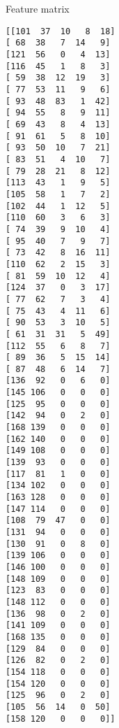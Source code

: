 \documentclass[a4paper]{article}
\begin{document}
~\\~\\
Feature matrix\\
\begin{lstlisting}
[[101  37  10   8  18]
[ 68  38   7  14   9]
[121  56   0   4  13]
[116  45   1   8   3]
[ 59  38  12  19   3]
[ 77  53  11   9   6]
[ 93  48  83   1  42]
[ 94  55   8   9  11]
[ 69  43   8   4  13]
[ 91  61   5   8  10]
[ 93  50  10   7  21]
[ 83  51   4  10   7]
[ 79  28  21   8  12]
[113  43   1   9   5]
[105  58   1   7   2]
[102  44   1  12   5]
[110  60   3   6   3]
[ 74  39   9  10   4]
[ 95  40   7   9   7]
[ 73  42   8  16  11]
[110  62   2  15   3]
[ 81  59  10  12   4]
[124  37   0   3  17]
[ 77  62   7   3   4]
[ 75  43   4  11   6]
[ 90  53   3  10   5]
[ 61  31  31   5  49]
[112  55   6   8   7]
[ 89  36   5  15  14]
[ 87  48   6  14   7]
[136  92   0   6   0]
[145 106   0   0   0]
[125  95   0   0   0]
[142  94   0   2   0]
[168 139   0   0   0]
[162 140   0   0   0]
[149 108   0   0   0]
[139  93   0   0   0]
[117  81   1   0   0]
[134 102   0   0   0]
[163 128   0   0   0]
[147 114   0   0   0]
[108  79  47   0   0]
[131  94   0   0   0]
[130  91   0   8   0]
[139 106   0   0   0]
[146 100   0   0   0]
[148 109   0   0   0]
[123  83   0   0   0]
[148 112   0   0   0]
[136  98   0   2   0]
[141 109   0   0   0]
[168 135   0   0   0]
[129  84   0   0   0]
[126  82   0   2   0]
[154 118   0   0   0]
[154 120   0   0   0]
[125  96   0   2   0]
[105  56  14   0  50]
[158 120   0   0   0]]
\end{lstlisting}
\end{document}
